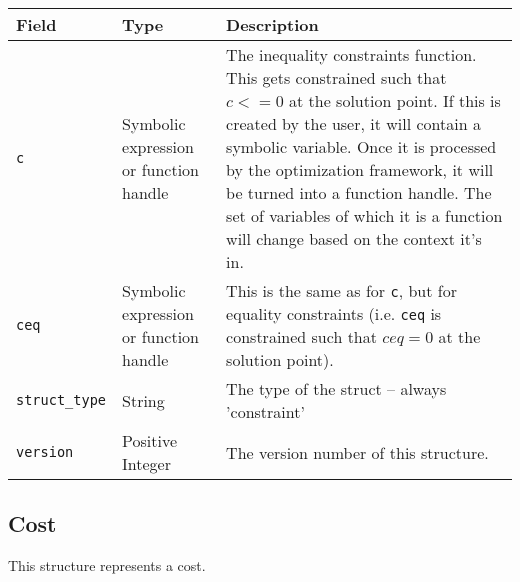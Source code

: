 \documentclass{article}
\begin{document}
			\begin{tabular}{ p{.15\textwidth} | p{} | p{190pt}}
				Field                   & Type                          & Description                                    \\ \hline
				\lstinline|c|           & \raggedright Symbolic expression or function handle
				                                                        & {\raggedright The inequality constraints
				                                                          function. This gets
				                                                          constrained such that $c <= 0$ at the solution
				                                                          point. If this is created by the user, it will
				                                                          contain a symbolic variable. Once it is
				                                                          processed by the optimization framework, it
				                                                          will be turned into a function handle. The
				                                                          set of variables of which it is a function
				                                                          will change based on the context it's in.}     \\[1ex]
				\lstinline|ceq|         & \raggedright Symbolic expression or function handle
				                                                        & This is the same as for \lstinline|c|, but for
				                                                          equality constraints (i.e. \lstinline|ceq| is
				                                                          constrained such that $ceq = 0$ at the solution
				                                                          point).                                        \\[4ex]
				\lstinline|struct_type| & String                        & The type of the struct -- always 'constraint'  \\[1ex]
				\lstinline|version|     & \raggedright Positive Integer & The version number of this structure.
			\end{tabular}

		\subsection{Cost}
			\label{sec:cost}

			This structure represents a cost.\nopagebreak

			\vspace{\baselineskip}\nopagebreak
\end{document}
